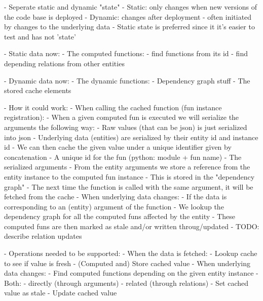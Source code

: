 



- Seperate static and dynamic "state"
  - Static: only changes when new versions of the code base is deployed
  - Dynamic: changes after deployment - often initiated by changes to the
             underlying data
  - Static state is preferred since it it's easier to test and has not 'state'

- Static data now:
  - The computed functions:
    - find functions from its id
    - find depending relations from other entities

- Dynamic data now:
  - The dynamic functions:
    - Dependency graph stuff
    - The stored cache elements

- How it could work:
  - When calling the cached function (fun instance registration):
    - When a given computed fun is executed we will serialize the arguments the following way:
      - Raw values (that can be json) is just serialized into json
      - Underlying data (entities) are serialized by their entity id and instance id
    - We can then cache the given value under a unique identifier given by concatenation
      - A unique id for the fun (python: module + fun name)
      - The serialized arguments
    - From the entity arguments we store a reference from the entity instance to the computed fun instance
      - This is stored in the "dependency graph"
    - The next time the function is called with the same argument, it will be fetched from the cache
  - When underlying data changes:
    - If the data is corresponding to an (entity) argument of the function
      - We lookup the dependency graph for all the computed funs affected by the entity
      - These computed funs are then marked as stale and/or written throug/updated
  - TODO: describe relation updates

- Operations needed to be supported:
  - When the data is fetched:
    - Lookup cache to see if value is fresh
    - (Computed and) Store cached value
  - When underlying data changes:
    - Find computed functions depending on the given entity instance
      - Both:
        - directly (through arguments)
        - related (through relations)
    - Set cached value as stale
    - Update cached value

